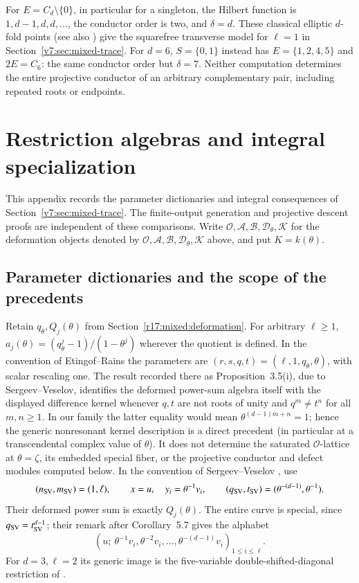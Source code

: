 \documentclass[10pt,fleqn]{article}
\numberwithin{equation}{section}
\begin{document}
For $E=C_d\setminus\{0\}$, in particular for a singleton, the Hilbert
function is
$1,d-1,d,d,\ldots$, the conductor order is two, and $\delta=d$.
These classical elliptic $d$-fold points \cite[Definition~2.1]{Smyth}
(see also \cite[Section~1]{Stevens}) give the
squarefree transverse model for $\ell=1$ in Section~\ref{v7:sec:mixed-trace}.
For $d=6$, $S=\{0,1\}$ instead has $E=\{1,2,4,5\}$ and $2E=C_6$:
the same conductor order but $\delta=7$.
Neither computation determines the entire projective conductor of an
arbitrary complementary pair, including repeated roots or endpoints.


\section{Restriction algebras and integral specialization}

\label{r17:mixed:comparisons}

This appendix records the parameter dictionaries and integral consequences
of Section~\ref{v7:sec:mixed-trace}.  The finite-output generation and
projective descent proofs are independent of these comparisons.
Write $\mathcal O,\mathcal A,\mathcal B,\mathcal D_\theta,\mathcal K$
for the deformation objects denoted by
$\mathscr O,\mathscr A,\mathscr B,\mathscr D_\theta,\mathscr K$ above,
and put $K=k(\theta)$.

\subsection{Parameter dictionaries and the scope of the precedents}
\label{r17:mixed:dictionary}

Retain $q_\theta,Q_j(\theta)$ from
Section~\ref{r17:mixed:deformation}.  For arbitrary $\ell\ge1$,
$a_j(\theta)=(q_\theta^j-1)/(1-\theta^j)$ wherever the quotient is
defined.  In the convention of Etingof--Rains the parameters are
$(r,s,q,t)=(\ell,1,q_\theta,\theta)$, with scalar rescaling one.  The
result recorded there as Proposition~3.5(i), due to Sergeev--Veselov,
identifies the deformed power-sum algebra itself with the displayed
difference kernel whenever $q,t$ are not roots of unity and
$q^m\ne t^n$ for all $m,n\ge1$.  In our family the latter equality would
mean $\theta^{(d-1)m+n}=1$; hence the generic nonresonant kernel
description is a direct precedent (in particular at a transcendental
complex value of $\theta$).  It does not determine the saturated
$\mathcal O$-lattice at $\theta=\zeta$, its embedded special fiber, or the
projective conductor and defect modules computed below.
In the convention of Sergeev--Veselov
\cite[Section~5, equations~(11)--(12), arXiv version]{SergeevVeselovMR}, use
\[
 (n_{\rm SV},m_{\rm SV})=(1,\ell),\qquad
 x=u,\quad y_i=\theta^{-1}v_i,\qquad
 (q_{\rm SV},t_{\rm SV})=(\theta^{-(d-1)},\theta^{-1}).
\]
Their deformed power sum is exactly $Q_j(\theta)$.  The entire curve is
special, since $q_{\rm SV}=t_{\rm SV}^{d-1}$; their remark after
Corollary~5.7 gives the alphabet
\[
 (u;\ \theta^{-1}v_i,\theta^{-2}v_i,\ldots,
             \theta^{-(d-1)}v_i)_{1\le i\le\ell}.
\]
For $d=3,\ell=2$ its generic image is the five-variable double-shifted-diagonal
restriction of \cite[Section~2, equation~(1) and Theorem~2.2]{KasataniMiwaSergeevVeselov}.
\end{document}
